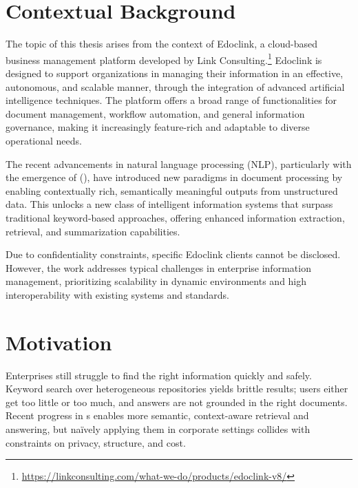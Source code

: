 \cleardoublepage
\label{chap:intro}
\section{Contextual Background}
The topic of this thesis arises from the context of Edoclink, a cloud-based business management platform developed by Link Consulting.\footnote{\url{https://linkconsulting.com/what-we-do/products/edoclink-v8/}} Edoclink is designed to support organizations in managing their information in an effective, autonomous, and scalable manner, through the integration of advanced artificial intelligence techniques. The platform offers a broad range of functionalities for document management, workflow automation, and general information governance, making it increasingly feature-rich and adaptable to diverse operational needs.

The recent advancements in natural language processing (\gls{NLP}), particularly with the emergence of (), have introduced new paradigms in document processing by enabling contextually rich, semantically meaningful outputs from unstructured data. This unlocks a new class of intelligent information systems that surpass traditional keyword-based approaches, offering enhanced information extraction, retrieval, and summarization capabilities.

Due to confidentiality constraints, specific Edoclink clients cannot be disclosed. However, the work addresses typical challenges in enterprise information management, prioritizing scalability in dynamic environments and high interoperability with existing systems and standards.

\section{Motivation}

Enterprises still struggle to find the right information quickly and safely. Keyword search over heterogeneous repositories yields brittle results; users either get too little or too much, and answers are not grounded in the right documents. Recent progress in s enables more semantic, context-aware retrieval and answering, but naïvely applying them in corporate settings collides with constraints on privacy, structure, and cost.

